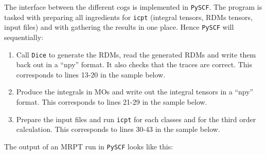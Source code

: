 \documentclass{article}
\newcommand  \var[1]       {\texttt{#1}}
\begin{document}
The interface between the different cogs is implemented in \var{PySCF}.
The program is tasked with preparing all ingredients for \var{icpt} (integral tensors, RDMs tensors, input files)
and with gathering the results in one place. Hence \var{PySCF} will sequentially:
\begin{enumerate}
\item Call \var{Dice} to generate the RDMs, read the generated RDMs and write them back out in a ``npy'' format.
      It also checks that the traces are correct.
      This corresponds to lines 13-20 in the sample below.
\item Produce the integrals in MOs and write out the integral tensors in a ``npy'' format.
      This corresponds to lines 21-29 in the sample below.
\item Prepare the input files and run \var{icpt}
      for each classes and for the third order calculation.
      This corresponds to lines 30-43 in the sample below.
\end{enumerate}
The output of an MRPT run in \var{PySCF} looks like this:
\end{document}
